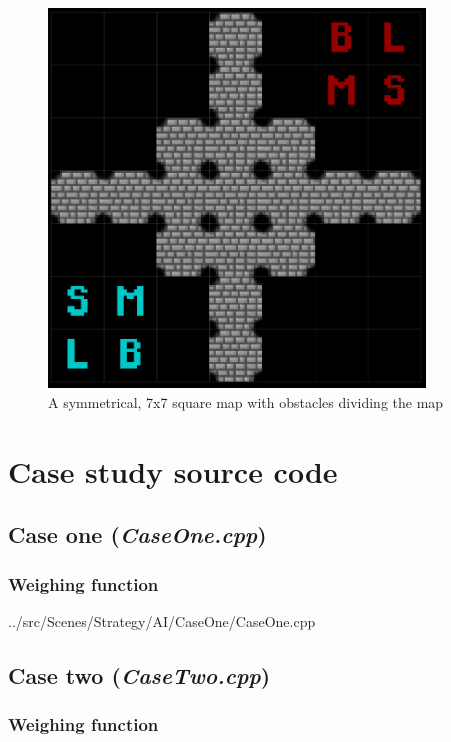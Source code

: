 \documentclass[11pt, a4paper]{report}
\begin{document}
\begin{appendices}
\begin{figure}[!h]
  \centering
  \includegraphics[width=10cm]{img/map_cross_with_block_7x7.png}
  \caption{A symmetrical, 7x7 square map with obstacles dividing the map}
  \label{fig:mapCrossWithBlock7x7}
\end{figure}

\chapter{Case study source code}
\label{appendix:caseStudySourceCode}

\section[Case one]{Case one (\emph{CaseOne.cpp})}
\label{sec:caseOneSourceCode}

\subsection{Weighing function}
\label{subsec:caseOneWeighingFunction}

\linespread{0.8}

{../src/Scenes/Strategy/AI/CaseOne/CaseOne.cpp}
\linespread{1.5}
\pagebreak

\section[Case two]{Case two (\emph{CaseTwo.cpp})}
\label{sec:caseTwoSourceCode}

\subsection{Weighing function}
\label{subsec:caseTwoWeighingFunction}


\end{appendices}
\end{document}
